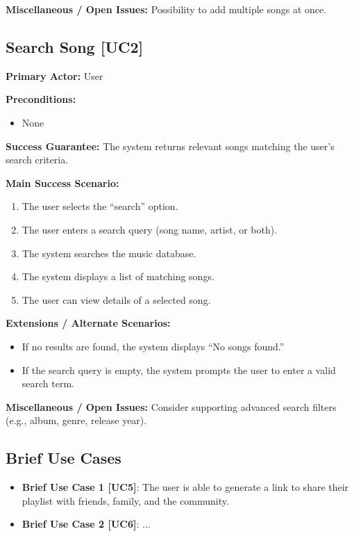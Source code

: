 \documentclass{article}
\begin{document}
\textbf{Miscellaneous / Open Issues:}  
Possibility to add multiple songs at once.

\subsection{Search Song [UC2]}
\textbf{Primary Actor:} User

\textbf{Preconditions:}
\begin{itemize}
  \item None
\end{itemize}

\textbf{Success Guarantee:}  
The system returns relevant songs matching the user’s search criteria.

\textbf{Main Success Scenario:}
\begin{enumerate}
  \item The user selects the ``search'' option.
  \item The user enters a search query (song name, artist, or both).
  \item The system searches the music database.
  \item The system displays a list of matching songs.
  \item The user can view details of a selected song.
\end{enumerate}

\textbf{Extensions / Alternate Scenarios:}
\begin{itemize}
  \item If no results are found, the system displays ``No songs found.''
  \item If the search query is empty, the system prompts the user to enter a valid search term.
\end{itemize}

\textbf{Miscellaneous / Open Issues:}  
Consider supporting advanced search filters (e.g., album, genre, release year).

\subsection{Brief Use Cases}

\begin{itemize}
    \item{\textbf{Brief Use Case 1 [UC5]}: The user is able to generate a link to share their playlist with friends, family, and the community.}
    \item{\textbf{Brief Use Case 2 [UC6]}: ...}
\end{itemize}
\end{document}

